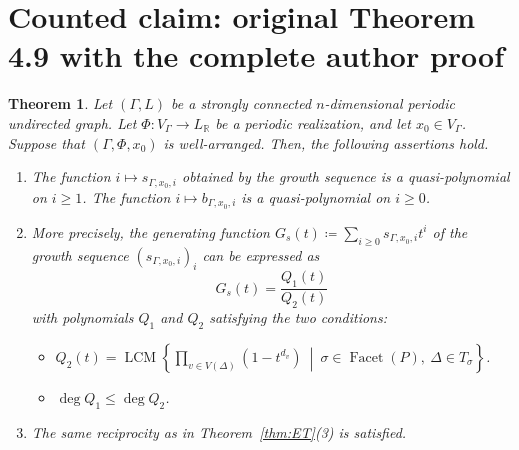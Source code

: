 \documentclass[10pt,a4paper]{amsart}
\theoremstyle{plain}
\newtheorem{thm}[cdrthm]{Theorem}
\theoremstyle{definition}
\theoremstyle{remark}
\begin{document}
\section*{Counted claim: original Theorem 4.9 with the complete author proof}
\begin{thm}\label{thm:WA}
Let $(\Gamma , L)$ be a strongly connected $n$-dimensional periodic undirected graph. 
Let $\Phi : V_{\Gamma} \to L_{\mathbb{R}}$ be a periodic realization, and let $x_0 \in V_{\Gamma}$. 
Suppose that $(\Gamma, \Phi, x_0)$ is well-arranged. 
Then, the following assertions hold. 
\begin{enumerate}
\item 
The function $i \mapsto s_{\Gamma, x_0, i}$ obtained 
by the growth sequence is a quasi-polynomial on $i \ge 1$. 
The function $i \mapsto b_{\Gamma, x_0, i}$  is a quasi-polynomial on $i \ge 0$. 

\item
More precisely, the generating function $G_s(t) \coloneqq  \sum _{i \ge 0} s_{\Gamma, x_0, i} t^i$ of 
the growth sequence $(s_{\Gamma, x_0, i})_i$ can be expressed as
\[
G_s(t) = \frac{Q_1(t)}{Q_2(t)}
\]
with polynomials $Q_1$ and $Q_2$ satisfying the two conditions:
\begin{itemize}
\item
$Q_2(t) = \operatorname{LCM} \left \{ \prod _{v \in V(\Delta)} (1 - t^{d_v}) 
\ \middle | \ \sigma \in \operatorname{Facet}(P),\ \Delta \in T_{\sigma} \right \}$. 

\item 
$\deg Q_1 \le \deg Q_2$. 
\end{itemize}

\item
The same reciprocity as in Theorem~\ref{thm:ET}(3) is satisfied. 
\end{enumerate}
\end{thm}
\end{document}
